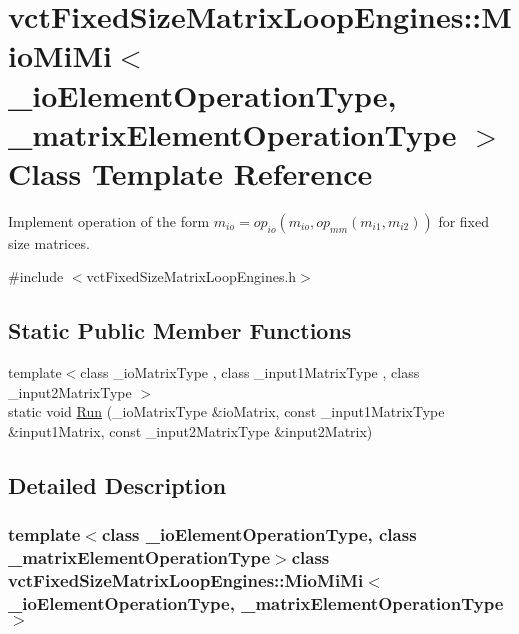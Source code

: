\hypertarget{classvct_fixed_size_matrix_loop_engines_1_1_mio_mi_mi}{\section{vct\-Fixed\-Size\-Matrix\-Loop\-Engines\-:\-:Mio\-Mi\-Mi$<$ \-\_\-io\-Element\-Operation\-Type, \-\_\-matrix\-Element\-Operation\-Type $>$ Class Template Reference}
\label{classvct_fixed_size_matrix_loop_engines_1_1_mio_mi_mi}
}


Implement operation of the form $m_{io} = op_{io}(m_{io}, op_{mm}(m_{i1}, m_{i2}))$ for fixed size matrices.  




{\ttfamily \#include $<$vct\-Fixed\-Size\-Matrix\-Loop\-Engines.\-h$>$}

\subsection*{Static Public Member Functions}
\begin{DoxyCompactItemize}
\item 
{\footnotesize template$<$class \-\_\-io\-Matrix\-Type , class \-\_\-input1\-Matrix\-Type , class \-\_\-input2\-Matrix\-Type $>$ }\\static void \hyperlink{classvct_fixed_size_matrix_loop_engines_1_1_mio_mi_mi_ad9d63b36eab33db52502a841e4fc4463}{Run} (\-\_\-io\-Matrix\-Type \&io\-Matrix, const \-\_\-input1\-Matrix\-Type \&input1\-Matrix, const \-\_\-input2\-Matrix\-Type \&input2\-Matrix)
\end{DoxyCompactItemize}


\subsection{Detailed Description}
\subsubsection*{template$<$class \-\_\-io\-Element\-Operation\-Type, class \-\_\-matrix\-Element\-Operation\-Type$>$class vct\-Fixed\-Size\-Matrix\-Loop\-Engines\-::\-Mio\-Mi\-Mi$<$ \-\_\-io\-Element\-Operation\-Type, \-\_\-matrix\-Element\-Operation\-Type $>$}

